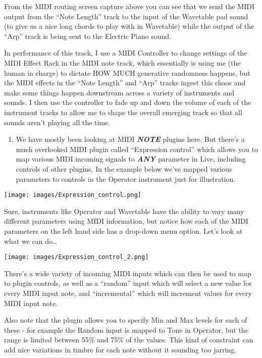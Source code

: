 \documentclass[
  12pt,
  letterpaper,
  oneside,
  open=any]{scrbook}
\providecommand{\tightlist}{%
  \setlength{\itemsep}{0pt}\setlength{\parskip}{0pt}}\usepackage{longtable,booktabs,array}
\begin{document}
From the MIDI routing screen capture above you can see that we send the
MIDI output from the ``Note Length'' track to the input of the Wavetable
pad sound (to give us a nice long chords to play with in Wavetable)
while the output of the ``Arp'' track is being sent to the Electric
Piano sound.

In performance of this track, I use a MIDI Controller to change settings
of the MIDI Effect Rack in the MIDI note track, which essentially is
using me (the human in charge) to dictate HOW MUCH generative randomness
happens, but the MIDI effects in the ``Note Length'' and ``Arp'' tracks
ingest this chaos and make some things happen downstream across a
variety of instruments and sounds. I then use the controller to fade up
and down the volume of each of the instrument tracks to allow me to
shape the overall emerging track so that all sounds aren't playing all
the time.

\begin{enumerate}
\def\labelenumi{\arabic{enumi}.}
\setcounter{enumi}{7}
\tightlist
\item
  We have mostly been looking at MIDI \textbf{\emph{NOTE}} plugins here.
  But there's a much overlooked MIDI plugin called ``Expression
  control'' which allows you to map various MIDI incoming signals to
  \textbf{\emph{ANY}} parameter in Live, including controls of other
  plugins. In the example below we've mapped various parameters to
  controls in the Operator instrument just for illustration.
\end{enumerate}

\texttt{[image: images/Expression\_control.png]}

Sure, instruments like Operator and Wavetable have the ability to vary
many different parameters using MIDI information, but notice how each of
the MIDI parameters on the left hand side has a drop-down menu option.
Let's look at what we can do\ldots{}

\texttt{[image: images/Expression\_control\_2.png]}

There's a wide variety of incoming MIDI inputs which can then be used to
map to plugin controls, as well as a ``random'' input which will select
a new value for every MIDI input note, and ``incremental'' which will
increment values for every MIDI input note.

Also note that the plugin allows you to specify Min and Max levels for
each of these - for example the Random input is mapped to Tone in
Operator, but the range is limited between 55\% and 75\% of the values.
This kind of constraint can add nice variations in timbre for each note
without it sounding too jarring.
\end{document}
